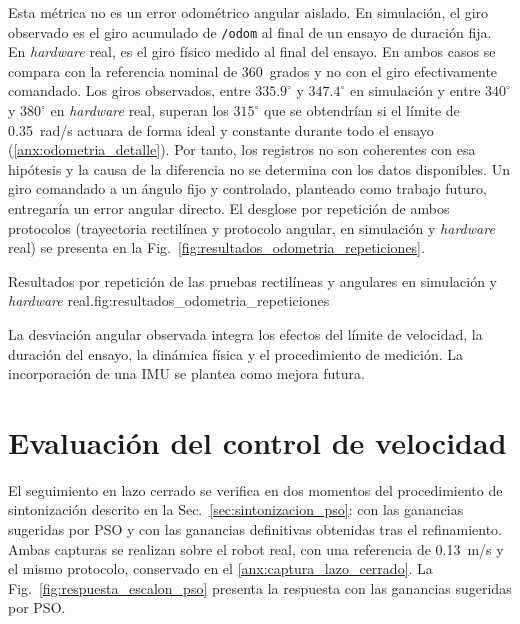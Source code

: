 Esta métrica no es un error odométrico angular aislado. En simulación, el giro observado es el giro acumulado de \texttt{/odom} al final de un ensayo de duración fija. En \textit{hardware} real, es el giro físico medido al final del ensayo. En ambos casos se compara con la referencia nominal de 360~grados y no con el giro efectivamente comandado. Los giros observados, entre $335.9^\circ$ y $347.4^\circ$ en simulación y entre $340^\circ$ y $380^\circ$ en \textit{hardware} real, superan los $315^\circ$ que se obtendrían si el límite de 0.35~rad/s actuara de forma ideal y constante durante todo el ensayo (\ref{anx:odometria_detalle}). Por tanto, los registros no son coherentes con esa hipótesis y la causa de la diferencia no se determina con los datos disponibles. Un giro comandado a un ángulo fijo y controlado, planteado como trabajo futuro, entregaría un error angular directo.
El desglose por repetición de ambos protocolos (trayectoria rectilínea y
protocolo angular, en simulación y \textit{hardware} real) se presenta en la
Fig.~\ref{fig:resultados_odometria_repeticiones}.

\begin{utemMultiFigurePropia}{Resultados por repetición de las pruebas rectilíneas y angulares en simulación y \textit{hardware} real.}{fig:resultados_odometria_repeticiones}
\hfill
{}
\\[0.4cm]
\hfill
{}
\end{utemMultiFigurePropia}

La desviación angular observada integra los efectos del límite de
velocidad, la duración del ensayo, la dinámica física y el procedimiento de
medición. La incorporación de una IMU se plantea como mejora futura.

\section{Evaluación del control de velocidad}
\label{sec:resultados_pid}

El seguimiento en lazo cerrado se verifica en dos momentos del procedimiento
de sintonización descrito en la Sec.~\ref{sec:sintonizacion_pso}: con las
ganancias sugeridas por PSO y con las ganancias definitivas obtenidas tras el
refinamiento. Ambas capturas se realizan sobre el robot real, con una
referencia de 0.13~m/s y el mismo protocolo, conservado en el
\ref{anx:captura_lazo_cerrado}. La Fig.~\ref{fig:respuesta_escalon_pso}
presenta la respuesta con las ganancias sugeridas por PSO.

